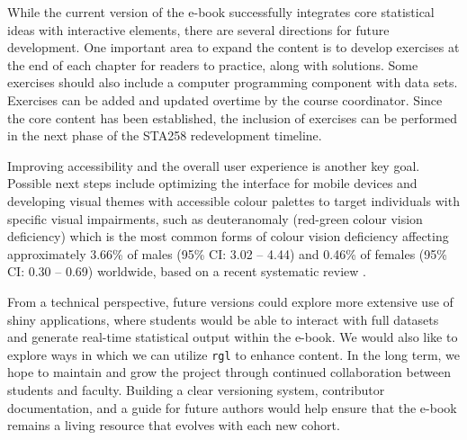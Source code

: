 \documentclass[11pt]{article}
\begin{document}

While the current version of the e-book successfully integrates core statistical ideas with interactive elements, there are several directions for future development. 
One important area to expand the content is to develop exercises at the end of each chapter for readers to practice, along with solutions.
Some exercises should also include a computer programming component with data sets.
Exercises can be added and updated overtime by the course coordinator.
Since the core content has been established, the inclusion of exercises can be performed in the next phase of the STA258 redevelopment timeline.


Improving accessibility and the overall user experience is another key goal. 
Possible next steps include optimizing the interface for mobile devices and developing visual themes with accessible colour palettes to target individuals with specific visual impairments, such as deuteranomaly (red-green colour vision deficiency) which is the most common forms of colour vision deficiency affecting approximately 3.66\% of males (95\% CI: 3.02 -- 4.44) and 0.46\% of females (95\% CI: 0.30 -- 0.69) worldwide, based on a recent systematic review \cite{Jeong2025}.

From a technical perspective, future versions could explore more extensive use of shiny applications, where students would be able to interact with full datasets and generate real-time statistical output within the e-book. 
We would also like to explore ways in which we can utilize \texttt{rgl} to enhance content.
In the long term, we hope to maintain and grow the project through continued collaboration between students and faculty. Building a clear versioning system, contributor documentation, and a guide for future authors would help ensure that the e-book remains a living resource that evolves with each new cohort.
\end{document}

